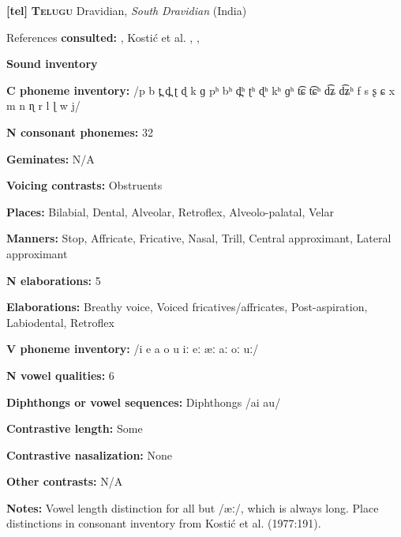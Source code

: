 \textbf{[tel]}   \textbf{\textsc{Telugu}}    Dravidian, \textit{South} \textit{Dravidian} (India)



References \textbf{consulted:} \citet{Kelley1963}, Kostić et al. , \citet{Krishnamurti1998}, \citet{BhaskararaoRay2017}



\textbf{Sound inventory}



\textbf{C phoneme inventory:} /p b t̪ d̪ ʈ ɖ k ɡ pʰ bʰ d̪ʰ ʈʰ ɖʰ kʰ ɡʰ t͡ɕ t͡ɕʰ d͡ʑ d͡ʑʰ f s ʂ ɕ x m n ɳ r l ɭ w j/



\textbf{N consonant phonemes:} 32



\textbf{Geminates:} N/A



\textbf{Voicing contrasts:} Obstruents



\textbf{Places:} Bilabial, Dental, Alveolar, Retroflex, Alveolo-palatal, Velar



\textbf{Manners:} Stop, Affricate, Fricative, Nasal, Trill, Central approximant, Lateral approximant



\textbf{N elaborations:} 5



\textbf{Elaborations:} Breathy voice, Voiced fricatives/affricates, Post-aspiration, Labiodental, Retroflex



\textbf{V phoneme inventory:} /i e a o u iː eː æː aː oː uː/



\textbf{N vowel qualities:} 6



\textbf{Diphthongs or vowel sequences:} Diphthongs /ai au/



\textbf{Contrastive length:} Some



\textbf{Contrastive nasalization:} None



\textbf{Other contrasts:} N/A



\textbf{Notes:} Vowel length distinction for all but /æː/, which is always long. Place distinctions in consonant inventory from Kostić et al. (1977:191).



